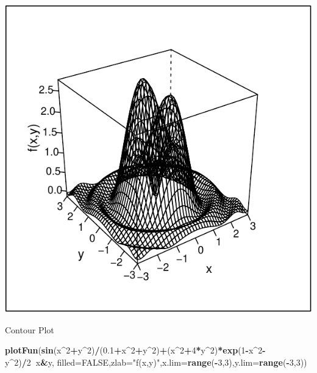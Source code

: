 \documentclass[
]{book}
\newenvironment{Shaded}{\begin{snugshade}}{\end{snugshade}}
\newcommand{\DataTypeTok}[1]{\textcolor[rgb]{0.13,0.29,0.53}{#1}}
\newcommand{\DecValTok}[1]{\textcolor[rgb]{0.00,0.00,0.81}{#1}}
\newcommand{\FloatTok}[1]{\textcolor[rgb]{0.00,0.00,0.81}{#1}}
\newcommand{\KeywordTok}[1]{\textcolor[rgb]{0.13,0.29,0.53}{\textbf{#1}}}
\newcommand{\NormalTok}[1]{#1}
\newcommand{\OperatorTok}[1]{\textcolor[rgb]{0.81,0.36,0.00}{\textbf{#1}}}
\newcommand{\OtherTok}[1]{\textcolor[rgb]{0.56,0.35,0.01}{#1}}
\newcommand{\StringTok}[1]{\textcolor[rgb]{0.31,0.60,0.02}{#1}}
\begin{document}
\includegraphics{_bookdown_files/math135_handbook_files/figure-latex/unnamed-chunk-73-1.pdf}

Contour Plot

\begin{Shaded}
\begin{Highlighting}[]
\KeywordTok{plotFun}\NormalTok{(}\KeywordTok{sin}\NormalTok{(x}\OperatorTok{^}\DecValTok{2}\OperatorTok{+}\NormalTok{y}\OperatorTok{^}\DecValTok{2}\NormalTok{)}\OperatorTok{/}\NormalTok{(}\FloatTok{0.1}\OperatorTok{+}\NormalTok{x}\OperatorTok{^}\DecValTok{2}\OperatorTok{+}\NormalTok{y}\OperatorTok{^}\DecValTok{2}\NormalTok{)}\OperatorTok{+}\NormalTok{(x}\OperatorTok{^}\DecValTok{2}\OperatorTok{+}\DecValTok{4}\OperatorTok{*}\NormalTok{y}\OperatorTok{^}\DecValTok{2}\NormalTok{)}\OperatorTok{*}\KeywordTok{exp}\NormalTok{(}\DecValTok{1}\OperatorTok{-}\NormalTok{x}\OperatorTok{^}\DecValTok{2}\OperatorTok{-}\NormalTok{y}\OperatorTok{^}\DecValTok{2}\NormalTok{)}\OperatorTok{/}\DecValTok{2}\OperatorTok{~}\NormalTok{x}\OperatorTok{&}\NormalTok{y,}
\DataTypeTok{filled=}\OtherTok{FALSE}\NormalTok{,}\DataTypeTok{zlab=}\StringTok{"f(x,y)"}\NormalTok{,}\DataTypeTok{x.lim=}\KeywordTok{range}\NormalTok{(}\OperatorTok{-}\DecValTok{3}\NormalTok{,}\DecValTok{3}\NormalTok{),}\DataTypeTok{y.lim=}\KeywordTok{range}\NormalTok{(}\OperatorTok{-}\DecValTok{3}\NormalTok{,}\DecValTok{3}\NormalTok{))}
\end{Highlighting}
\end{Shaded}
\end{document}
